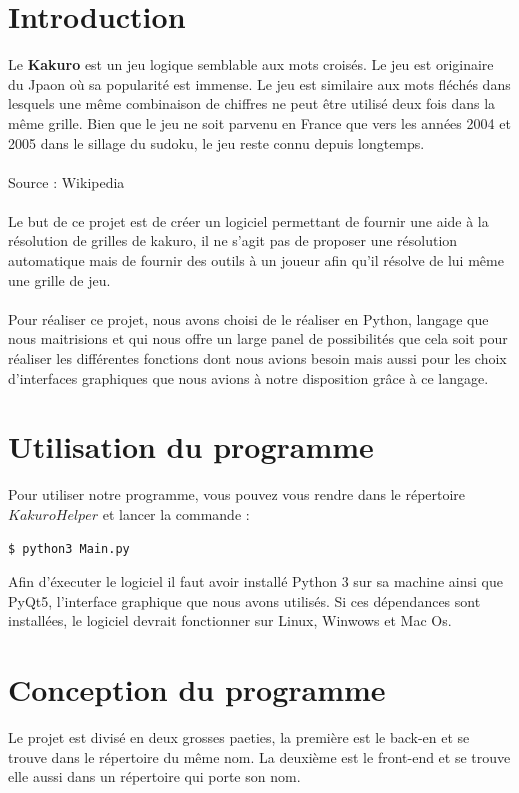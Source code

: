 \documentclass[12pt]{article}
\begin{document}
\tableofcontents
\newpage


\section{Introduction}
Le \textbf{Kakuro} est un jeu logique semblable aux mots croisés. Le jeu est originaire du Jpaon où sa popularité est immense. Le jeu est similaire aux mots fléchés dans lesquels une même combinaison de chiffres ne peut être utilisé deux fois dans la même grille. Bien que le jeu ne soit parvenu en France que vers les années 2004 et 2005 dans le sillage du sudoku, le jeu reste connu depuis longtemps. \\ \\ Source : Wikipedia \\ \\
Le but de ce projet est de créer un logiciel permettant de fournir une aide à la résolution de grilles de kakuro, il ne s'agit pas de proposer une résolution automatique mais de fournir des outils à un joueur afin qu'il résolve de lui même une grille de jeu. \\\ \\
Pour réaliser ce projet, nous avons choisi de le réaliser en Python, langage que nous maitrisions et qui nous offre un large panel de possibilités que cela soit pour réaliser les différentes fonctions dont nous avions besoin mais aussi pour les choix d'interfaces graphiques que nous avions à notre disposition grâce à ce langage. 
\section{Utilisation du programme}
Pour utiliser notre programme, vous pouvez vous rendre dans le répertoire $Kakuro Helper$ et lancer la commande :
\begin{lstlisting}[language=bash]
  $ python3 Main.py
\end{lstlisting}
Afin d'éxecuter le logiciel il faut avoir installé Python 3 sur sa machine ainsi que PyQt5, l'interface graphique que nous avons utilisés. Si ces dépendances sont installées, le logiciel devrait fonctionner sur Linux, Winwows et Mac Os.

\newpage
\section{Conception du programme}
Le projet est divisé en deux grosses paeties, la première est le back-en et se trouve dans le répertoire du même nom. La deuxième est le front-end et se trouve elle aussi dans un répertoire qui porte son nom.
\end{document}
